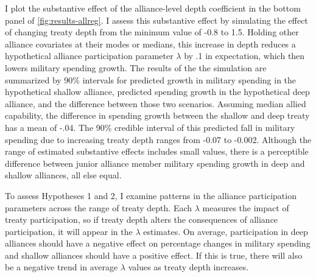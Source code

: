 \documentclass[12pt]{article}
\begin{document}
I plot the substantive effect of the alliance-level depth coefficient in the bottom panel of \autoref{fig:results-allreg}. 
I assess this substantive effect by simulating the effect of changing treaty depth from the minimum value of -0.8 to 1.5. 
Holding other alliance covariates at their modes or medians, this increase in depth reduces a hypothetical alliance participation parameter $\lambda$ by .1 in expectation, which then lowers military spending growth.
The results of the the simulation are summarized by 90\% intervals for predicted growth in military spending in the hypothetical shallow alliance, predicted spending growth in the hypothetical deep alliance, and the difference between those two scenarios.
Assuming median allied capability, the difference in spending growth between the shallow and deep treaty has a mean of -.04.
The 90\% credible interval of this predicted fall in military spending due to increasing treaty depth ranges from -0.07 to -0.002.
Although the range of estimated substantive effects includes small values, there is a perceptible difference between junior alliance member military spending growth in deep and shallow alliances, all else equal.  


To assess Hypotheses 1 and 2, I examine patterns in the alliance participation parameters across the range of treaty depth.
Each $\lambda$ measures the impact of treaty participation, so if treaty depth alters the consequences of alliance participation, it will appear in the $\lambda$ estimates. 
On average, participation in deep alliances should have a negative effect on percentage changes in military spending and shallow alliances should have a positive effect.
If this is true, there will also be a negative trend in average $\lambda$ values as treaty depth increases.
\end{document}
